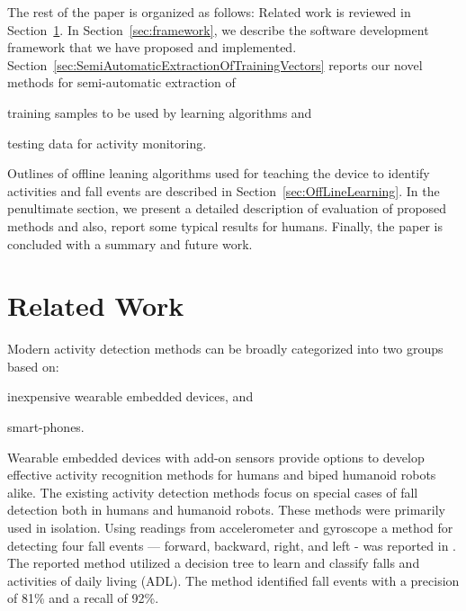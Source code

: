 \documentclass[]{IEEEtran}
\begin{document}
The rest of the paper is organized as follows: Related work is reviewed in Section~\ref{subSec:relatedWork}. In Section~\ref{sec:framework}, we describe the software development 
framework that we have proposed and implemented.
Section~\ref{sec:SemiAutomaticExtractionOfTrainingVectors} reports our novel methods for  
semi-automatic extraction  of \begin{inparaenum} [($i$)] \item training samples to be 
used by  learning algorithms  and \item testing data for activity monitoring. 
\end{inparaenum} Outlines of offline leaning algorithms used for teaching the device to 
identify activities and fall events are described in Section~\ref{sec:OffLineLearning}. 
 In the penultimate section, we present a detailed description of evaluation of proposed methods and also, report some typical results for humans.
Finally, the paper is concluded with a summary and future work.  

\section{Related Work}
\label{subSec:relatedWork}

Modern activity detection methods can be broadly categorized into two groups based on: 
\begin{inparaenum}[($i$)] \item inexpensive wearable embedded devices, and \item smart-phones. 
\end{inparaenum} Wearable embedded devices with add-on sensors provide options to develop effective 
activity recognition methods for humans and biped humanoid robots alike. The existing activity 
detection methods focus on special cases of fall detection both in humans and humanoid robots. These 
methods were primarily used in isolation.  Using readings from accelerometer and gyroscope a method for detecting four fall events --- forward, backward, right, and left - was reported in \cite{ojetolaFallDetection2011}.  The reported method utilized  a decision tree to 
learn and classify falls and activities of daily living (ADL). The method identified fall events 
with a precision of 81\%  and a recall of 92\%. 
\end{document}
